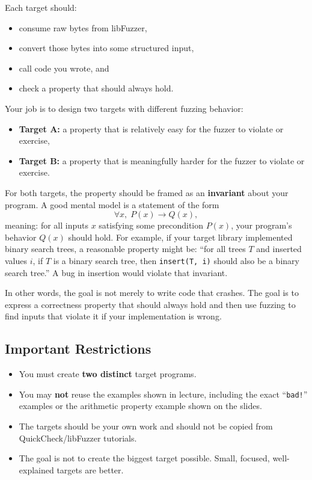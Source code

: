 \documentclass[11pt]{article}
\begin{document}
Each target should:
\begin{itemize}
    \item consume raw bytes from libFuzzer,
    \item convert those bytes into some structured input,
    \item call code you wrote, and
    \item check a property that should always hold.
\end{itemize}

Your job is to design two targets with different fuzzing behavior:
\begin{itemize}
    \item \textbf{Target A:} a property that is relatively easy for the fuzzer to violate or exercise,
    \item \textbf{Target B:} a property that is meaningfully harder for the fuzzer to violate or exercise.
\end{itemize}

For both targets, the property should be framed as an \textbf{invariant} about your program. A good mental model is a statement of the form
\[
\forall x,\; P(x) \rightarrow Q(x),
\]
meaning: for all inputs \(x\) satisfying some precondition \(P(x)\), your program's behavior \(Q(x)\) should hold. For example, if your target library implemented binary search trees, a reasonable property might be: ``for all trees \(T\) and inserted values \(i\), if \(T\) is a binary search tree, then \texttt{insert(T, i)} should also be a binary search tree.'' A bug in insertion would violate that invariant.

In other words, the goal is not merely to write code that crashes. The goal is to express a correctness property that should always hold and then use fuzzing to find inputs that violate it if your implementation is wrong.

\subsection*{Important Restrictions}
\begin{itemize}
    \item You must create \textbf{two distinct} target programs.
    \item You may \textbf{not} reuse the examples shown in lecture, including the exact ``\texttt{bad!}'' examples or the arithmetic property example shown on the slides.
    \item The targets should be your own work and should not be copied from QuickCheck/libFuzzer tutorials.
    \item The goal is not to create the biggest target possible. Small, focused, well-explained targets are better.
\end{itemize}
\end{document}
